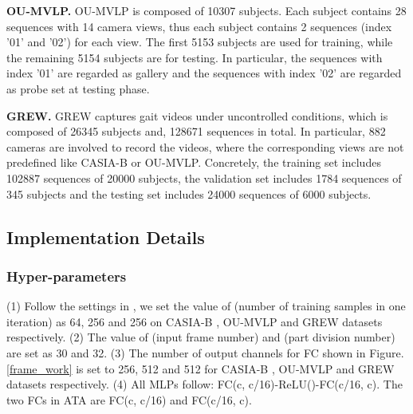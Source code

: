 \documentclass[journal]{IEEEtran}
\begin{document}
\noindent \textbf{OU-MVLP.} OU-MVLP \cite{takemura2018multi} is composed of 10307 subjects. Each subject contains 28 sequences with 14 camera views, thus each subject contains 2 sequences (index '01' and '02') for each view. The first 5153 subjects are used for training, while the remaining 5154 subjects are for testing. In particular, the sequences with index '01' are regarded as gallery and the sequences with index '02' are regarded as probe set at testing phase.

\noindent \textbf{GREW.} GREW \cite{takemura2018multi} captures gait videos under uncontrolled conditions, which is composed of 26345 subjects and, 128671 sequences in total. In particular, 882 cameras are involved to record the videos, where the corresponding views are not predefined like CASIA-B or OU-MVLP. Concretely, the training set includes 102887 sequences of 20000 subjects, the validation set includes 1784 sequences of 345 subjects and the testing set includes 24000 sequences of 6000 subjects. 

\subsection{Implementation Details}
\subsubsection{Hyper-parameters}
(1) Follow the settings in \cite{cstl,GaitGL}, we set the value of  (number of training samples in one iteration) as 64, 256 and 256 on CASIA-B \cite{yu2006framework}, OU-MVLP \cite{takemura2018multi} and GREW \cite{grew} datasets respectively. (2) The value of  (input frame number) and  (part division number) are set as 30 and 32. (3) The number of output channels for FC shown in Figure. \ref{frame_work} is set to 256, 512 and 512 for CASIA-B \cite{yu2006framework}, OU-MVLP \cite{takemura2018multi} and GREW \cite{grew} datasets respectively. (4) All MLPs follow: FC(c, c/16)-ReLU()-FC(c/16, c). The two FCs in ATA are FC(c, c/16) and FC(c/16, c).
\end{document}
